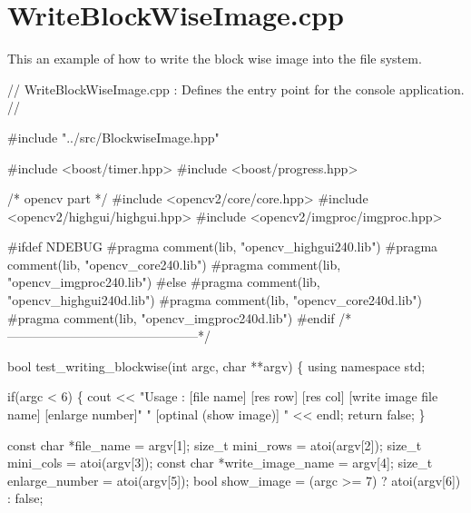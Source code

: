 \section{Write\-Block\-Wise\-Image.\-cpp}
This an example of how to write the block wise image into the file system.


\begin{DoxyCodeInclude}
\textcolor{comment}{// WriteBlockWiseImage.cpp : Defines the entry point for the console
       application.}
\textcolor{comment}{//}

\textcolor{preprocessor}{#include "../src/BlockwiseImage.hpp"}

\textcolor{preprocessor}{#include <boost/timer.hpp>}
\textcolor{preprocessor}{#include <boost/progress.hpp>}

\textcolor{comment}{/* opencv part */}
\textcolor{preprocessor}{#include <opencv2/core/core.hpp>}
\textcolor{preprocessor}{#include <opencv2/highgui/highgui.hpp>}
\textcolor{preprocessor}{#include <opencv2/imgproc/imgproc.hpp>}

\textcolor{preprocessor}{#ifdef NDEBUG}
\textcolor{preprocessor}{}\textcolor{preprocessor}{#pragma comment(lib, "opencv\_highgui240.lib")}
\textcolor{preprocessor}{}\textcolor{preprocessor}{#pragma comment(lib, "opencv\_core240.lib")}
\textcolor{preprocessor}{}\textcolor{preprocessor}{#pragma comment(lib, "opencv\_imgproc240.lib")}
\textcolor{preprocessor}{}\textcolor{preprocessor}{#else}
\textcolor{preprocessor}{}\textcolor{preprocessor}{#pragma comment(lib, "opencv\_highgui240d.lib")}
\textcolor{preprocessor}{}\textcolor{preprocessor}{#pragma comment(lib, "opencv\_core240d.lib")}
\textcolor{preprocessor}{}\textcolor{preprocessor}{#pragma comment(lib, "opencv\_imgproc240d.lib")}
\textcolor{preprocessor}{}\textcolor{preprocessor}{#endif}
\textcolor{preprocessor}{}\textcolor{comment}{/*---------------------------------------------*/}

\textcolor{keywordtype}{bool} test\_writing\_blockwise(\textcolor{keywordtype}{int} argc, \textcolor{keywordtype}{char} **argv)
\{
        \textcolor{keyword}{using namespace }std;

        \textcolor{keywordflow}{if}(argc < 6) \{
                cout << \textcolor{stringliteral}{"Usage : [file name] [res row] [res col] [write image
       file name] [enlarge number]"}
                        \textcolor{stringliteral}{" [optinal (show image)] "} << endl;
                \textcolor{keywordflow}{return} \textcolor{keyword}{false};
        \}

        \textcolor{keyword}{const} \textcolor{keywordtype}{char} *file\_name = argv[1];
        \textcolor{keywordtype}{size\_t} mini\_rows = atoi(argv[2]);
        \textcolor{keywordtype}{size\_t} mini\_cols = atoi(argv[3]);
        \textcolor{keyword}{const} \textcolor{keywordtype}{char} *write\_image\_name = argv[4];
        \textcolor{keywordtype}{size\_t} enlarge\_number = atoi(argv[5]);
        \textcolor{keywordtype}{bool} show\_image = (argc >= 7) ? atoi(argv[6]) : \textcolor{keyword}{false};


\end{DoxyCodeInclude}
